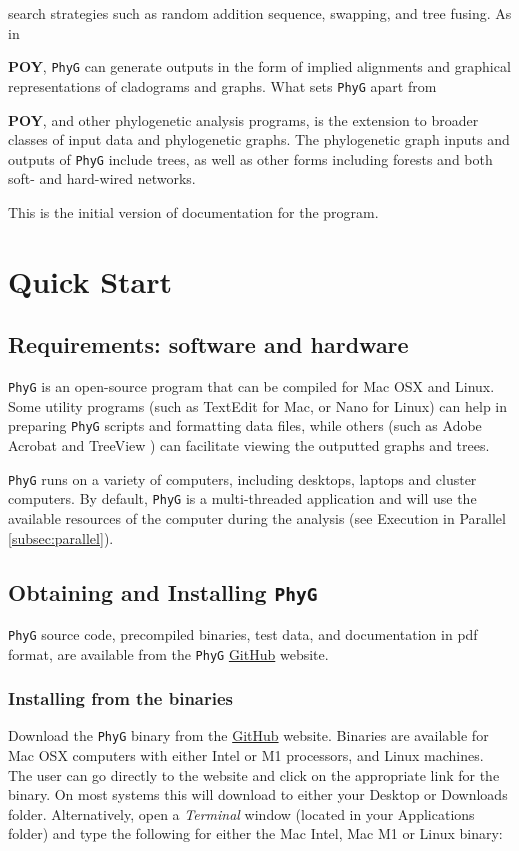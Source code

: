 \documentclass[11pt]{book}
\newcommand{\phyg}{\texttt{PhyG} }
\begin{document}
	search strategies such as random addition sequence, swapping, and tree fusing. As in {\textbf{POY}, 
	\phyg can generate outputs in the form of implied alignments and graphical representations of 
	cladograms and graphs. What sets \phyg apart from {\textbf{POY}, and other phylogenetic 
	analysis programs, is the extension to broader classes of input data and phylogenetic graphs. 
	The phylogenetic graph inputs and outputs of \texttt{PhyG} include trees, as well as other forms 
	including forests and both soft- and hard-wired networks.
		
	This is the initial version of documentation for the program.

	\section{Quick Start}
	
		\subsection{Requirements: software and hardware}
		\phyg is an open-source program that can be compiled for Mac OSX and Linux. Some 
		utility programs (such as TextEdit for Mac, or Nano for Linux) can help in preparing 
		\phyg scripts and formatting data files, while others (such as Adobe Acrobat and TreeView 
		\citep{page1996}) can facilitate viewing the outputted graphs and trees.
		
		\phyg runs on a variety of computers, including desktops, laptops and cluster computers.
		By default, \phyg is a multi-threaded application and will use the available resources of 
		the computer during the analysis (see Execution in Parallel \ref{subsec:parallel}). 
		
		\subsection{Obtaining and Installing \phyg}
		\phyg source code, precompiled binaries, test data, and documentation in pdf format, 
		are available from the \phyg \href{https://github.com/amnh/PhyGraph}{GitHub} website.

		\subsubsection{Installing from the binaries}
		Download the \phyg binary from the \href{https://github.com/amnh/PhyGraph}{GitHub} 
		website. Binaries are available for Mac OSX computers with either Intel or M1 processors, 
		and Linux machines. The user can go directly to the website and click on the appropriate link 
		for the binary. On most systems this will download to either your Desktop or Downloads folder. 
		Alternatively, open a \textit{Terminal} window (located in your Applications folder) and type 
		the following for either the Mac Intel, Mac M1 or Linux binary:
		
}}
\end{document}
